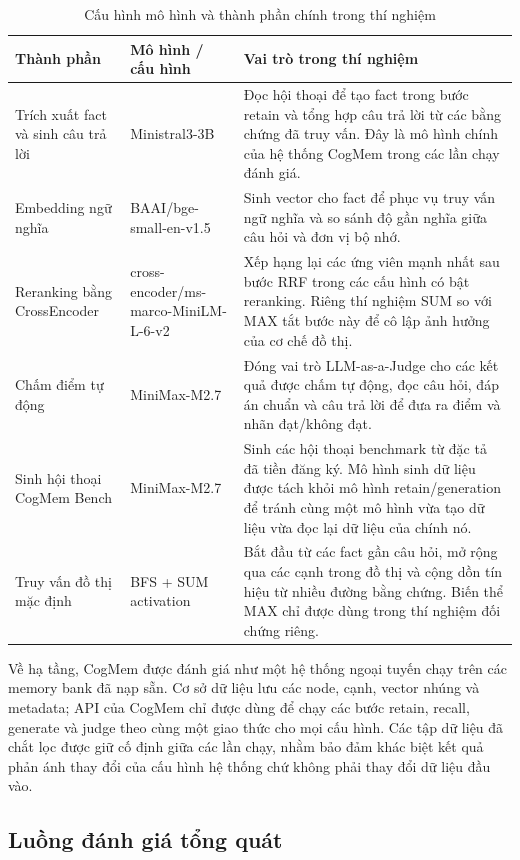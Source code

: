 \documentclass[../main.tex]{subfiles}
\begin{document}
\begin{table}[H]
\centering
\caption{Cấu hình mô hình và thành phần chính trong thí nghiệm}
\label{tab:experiment_runtime_config}
\small
\begin{tabularx}{\linewidth}{@{}p{3.8cm}p{4.2cm}Y@{}}
\toprule
\textbf{Thành phần} & \textbf{Mô hình / cấu hình} & \textbf{Vai trò trong thí nghiệm} \\
\midrule
Trích xuất fact và sinh câu trả lời & Ministral3-3B & Đọc hội thoại để tạo fact trong bước retain và tổng hợp câu trả lời từ các bằng chứng đã truy vấn. Đây là mô hình chính của hệ thống CogMem trong các lần chạy đánh giá. \\
Embedding ngữ nghĩa & BAAI/bge-small-en-v1.5 & Sinh vector cho fact để phục vụ truy vấn ngữ nghĩa và so sánh độ gần nghĩa giữa câu hỏi và đơn vị bộ nhớ. \\
Reranking bằng CrossEncoder & cross-encoder/ms-marco-MiniLM-L-6-v2 & Xếp hạng lại các ứng viên mạnh nhất sau bước RRF trong các cấu hình có bật reranking. Riêng thí nghiệm SUM so với MAX tắt bước này để cô lập ảnh hưởng của cơ chế đồ thị. \\
Chấm điểm tự động & MiniMax-M2.7 & Đóng vai trò LLM-as-a-Judge cho các kết quả được chấm tự động, đọc câu hỏi, đáp án chuẩn và câu trả lời để đưa ra điểm và nhãn đạt/không đạt. \\
Sinh hội thoại CogMem Bench & MiniMax-M2.7 & Sinh các hội thoại benchmark từ đặc tả đã tiền đăng ký. Mô hình sinh dữ liệu được tách khỏi mô hình retain/generation để tránh cùng một mô hình vừa tạo dữ liệu vừa đọc lại dữ liệu của chính nó. \\
Truy vấn đồ thị mặc định & BFS + SUM activation & Bắt đầu từ các fact gần câu hỏi, mở rộng qua các cạnh trong đồ thị và cộng dồn tín hiệu từ nhiều đường bằng chứng. Biến thể MAX chỉ được dùng trong thí nghiệm đối chứng riêng. \\
\bottomrule
\end{tabularx}
\end{table}

Về hạ tầng, CogMem được đánh giá như một hệ thống ngoại tuyến chạy trên các memory bank đã nạp sẵn. Cơ sở dữ liệu lưu các node, cạnh, vector nhúng và metadata; API của CogMem chỉ được dùng để chạy các bước retain, recall, generate và judge theo cùng một giao thức cho mọi cấu hình. Các tập dữ liệu đã chắt lọc được giữ cố định giữa các lần chạy, nhằm bảo đảm khác biệt kết quả phản ánh thay đổi của cấu hình hệ thống chứ không phải thay đổi dữ liệu đầu vào.

\subsection{Luồng đánh giá tổng quát}
\end{document}
